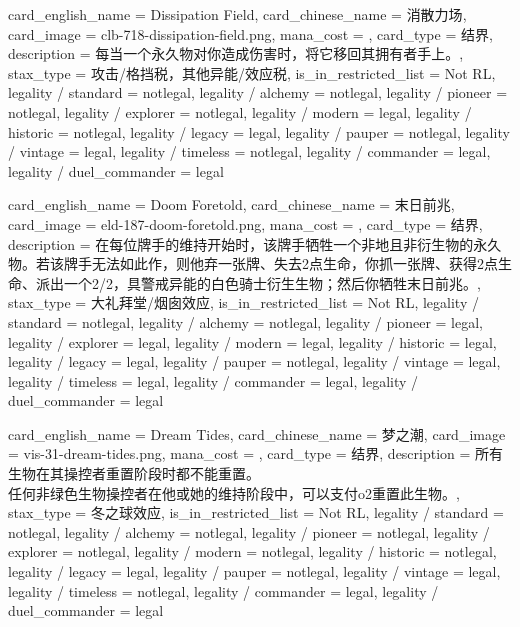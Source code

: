 \documentclass[lang = cn, color = black, 10pt]{AllThatStax}
\begin{document}
\card
{
	card_english_name = {Dissipation Field},
	card_chinese_name = {消散力场},
	card_image = clb-718-dissipation-field.png,
	mana_cost = ,
	card_type = 结界,
	description = {每当一个永久物对你造成伤害时，将它移回其拥有者手上。},
	stax_type = 攻击/格挡税，其他异能/效应税,
	is_in_restricted_list = Not RL,
	legality / standard = notlegal,
	legality / alchemy = notlegal,
	legality / pioneer = notlegal,
	legality / explorer = notlegal,
	legality / modern = legal,
	legality / historic = notlegal,
	legality / legacy = legal,
	legality / pauper = notlegal,
	legality / vintage = legal,
	legality / timeless = notlegal,
	legality / commander = legal,
	legality / duel_commander = legal
}

\card
{
	card_english_name = {Doom Foretold},
	card_chinese_name = {末日前兆},
	card_image = eld-187-doom-foretold.png,
	mana_cost = ,
	card_type = 结界,
	description = {在每位牌手的维持开始时，该牌手牺牲一个非地且非衍生物的永久物。若该牌手无法如此作，则他弃一张牌、失去2点生命，你抓一张牌、获得2点生命、派出一个2/2，具警戒异能的白色骑士衍生生物；然后你牺牲末日前兆。},
	stax_type = 大礼拜堂/烟囱效应,
	is_in_restricted_list = Not RL,
	legality / standard = notlegal,
	legality / alchemy = notlegal,
	legality / pioneer = legal,
	legality / explorer = legal,
	legality / modern = legal,
	legality / historic = legal,
	legality / legacy = legal,
	legality / pauper = notlegal,
	legality / vintage = legal,
	legality / timeless = legal,
	legality / commander = legal,
	legality / duel_commander = legal
}

\card
{
	card_english_name = {Dream Tides},
	card_chinese_name = {梦之潮},
	card_image = vis-31-dream-tides.png,
	mana_cost = ,
	card_type = 结界,
	description = {所有生物在其操控者重置阶段时都不能重置。\\
任何非绿色生物操控者在他或她的维持阶段中，可以支付o2重置此生物。},
	stax_type = 冬之球效应,
	is_in_restricted_list = Not RL,
	legality / standard = notlegal,
	legality / alchemy = notlegal,
	legality / pioneer = notlegal,
	legality / explorer = notlegal,
	legality / modern = notlegal,
	legality / historic = notlegal,
	legality / legacy = legal,
	legality / pauper = notlegal,
	legality / vintage = legal,
	legality / timeless = notlegal,
	legality / commander = legal,
	legality / duel_commander = legal
}
\end{document}
